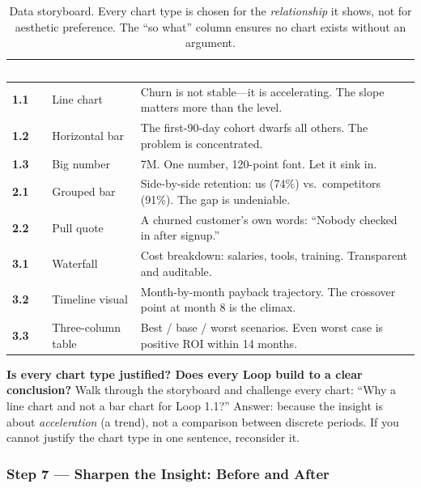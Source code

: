 \begin{table}[H]
\centering
\small
{}
\begin{tabularx}{\textwidth}{>{\bfseries\color{heading}}l l X}
\toprule
\rowcolor{tableheader}
\textcolor{white}{\textbf{Loop}} & \textcolor{white}{\textbf{Chart type}} & \textcolor{white}{\textbf{So what}} \\
\midrule
1.1 & Line chart & Churn is not stable---it is accelerating. The slope matters more than the level. \\
1.2 & Horizontal bar & The first-90-day cohort dwarfs all others. The problem is concentrated. \\
1.3 & Big number & \texteuro{}7M. One number, 120-point font. Let it sink in. \\
2.1 & Grouped bar & Side-by-side retention: us (74\%) vs.\ competitors (91\%). The gap is undeniable. \\
2.2 & Pull quote & A churned customer's own words: ``Nobody checked in after signup.'' \\
3.1 & Waterfall & Cost breakdown: salaries, tools, training. Transparent and auditable. \\
3.2 & Timeline visual & Month-by-month payback trajectory. The crossover point at month 8 is the climax. \\
3.3 & Three-column table & Best / base / worst scenarios. Even worst case is positive ROI within 14 months. \\
\bottomrule
\end{tabularx}
\caption{Data storyboard. Every chart type is chosen for the \emph{relationship} it shows, not for aesthetic preference. The ``so what'' column ensures no chart exists without an argument.}
\end{table}

\begin{insightbox}
\textbf{Is every chart type justified? Does every Loop build to a clear conclusion?} Walk through the storyboard and challenge every chart: ``Why a line chart and not a bar chart for Loop 1.1?'' Answer: because the insight is about \emph{acceleration} (a trend), not a comparison between discrete periods. If you cannot justify the chart type in one sentence, reconsider it.
\end{insightbox}

\subsubsection*{Step 7 --- Sharpen the Insight: Before and After}

